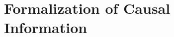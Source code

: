 \documentclass[letterpaper]{article} %
\theoremstyle{definition}
\theoremstyle{remark}
\begin{document}






\appendix
\onecolumn
\section{Formalization of Causal Information}\label{sec:causal}
\end{document}
